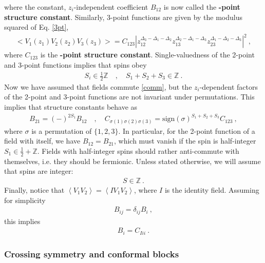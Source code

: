 \documentclass[12pt, a4paper]{article}
\newcommand{\myindex}[1]{\textbf{\boldmath #1}}
\begin{document}
where the constant, $z_i$-independent coefficient $B_{12}$ is now called the \myindex{2-point structure constant}. Similarly, 3-point functions are given by the modulus squared of Eq. \eqref{3pt},
\begin{align}
 \boxed{  \Big< V_1(z_1)V_2(z_2)V_3(z_3) \Big> = C_{123} \left|z_{12}^{\Delta_3-\Delta_1-\Delta_2} z_{13}^{\Delta_2-\Delta_1-\Delta_3} z_{23}^{\Delta_1-\Delta_2-\Delta_3}\right|^2 }\ ,
 \label{3ptc}
\end{align}
where $C_{123}$ is the \myindex{3-point structure constant}. Single-valuedness of the 2-point and 3-point functions implies that spins obey
\begin{align}
 S_i\in\frac12 \mathbb{Z} \quad , \quad S_1+S_2+S_3 \in\mathbb{Z}\ . 
 \label{sihz}
\end{align}
Now we have assumed that fields commute \eqref{comm}, but the $z_i$-dependent factors of the 2-point and 3-point functions are not invariant under permutations. This implies that structure constants behave as
\begin{align}
 B_{21} = (-)^{2S_1} B_{12} \quad ,\quad C_{\sigma(1)\sigma(2)\sigma(3)} = \text{sign}(\sigma)^{S_1+S_2+S_3} C_{123}\ , 
 \label{b21}
\end{align}
where $\sigma$ is a permutation of $\{1,2,3\}$. In particular, for the 2-point function of a field with itself, we have $B_{12}=B_{21}$, which must vanish if the spin is half-integer $S_1\in \frac12+\mathbb{Z}$. Fields with half-integer spins should rather anti-commute with themselves, i.e. they should be fermionic. 
Unless stated otherwise, we will assume that spins are integer:
\begin{align}
 \boxed{S\in \mathbb{Z}}\ .
 \label{siz}
\end{align}
Finally, notice that $\left<V_1V_2\right> = \left<IV_1V_2\right>$, where $I$ is the identity field. Assuming for simplicity
\begin{align}
 B_{ij}=\delta_{ij}B_i\ ,
\end{align}
this implies 
\begin{align}
 \boxed{B_i = C_{Iii}}\ .
 \label{bicii}
\end{align}


\subsubsection{Crossing symmetry and conformal blocks}\label{sec:cscb}
\end{document}
